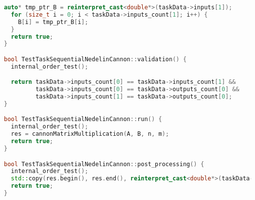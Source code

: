 \documentclass{report}
\begin{document}
\begin{lstlisting}[language=C++,caption=Последовательная версия]
  auto* tmp_ptr_B = reinterpret_cast<double*>(taskData->inputs[1]);
  for (size_t i = 0; i < taskData->inputs_count[1]; i++) {
    B[i] = tmp_ptr_B[i];
  }
  return true;
}

bool TestTaskSequentialNedelinCannon::validation() {
  internal_order_test();

  return taskData->inputs_count[0] == taskData->inputs_count[1] &&
         taskData->inputs_count[0] == taskData->outputs_count[0] &&
         taskData->inputs_count[1] == taskData->outputs_count[0];
}

bool TestTaskSequentialNedelinCannon::run() {
  internal_order_test();
  res = cannonMatrixMultiplication(A, B, n, m);
  return true;
}

bool TestTaskSequentialNedelinCannon::post_processing() {
  internal_order_test();
  std::copy(res.begin(), res.end(), reinterpret_cast<double*>(taskData->outputs[0]));
  return true;
}
\end{lstlisting}

\newpage
\end{document}
